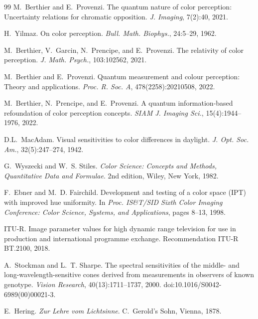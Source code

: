 \documentclass[11pt]{article}
\theoremstyle{plain}
\theoremstyle{definition}
\theoremstyle{remark}
\begin{document}
\begin{thebibliography}{99}
M.~Berthier and E.~Provenzi.
\newblock The quantum nature of color perception: Uncertainty relations for chromatic opposition.
\newblock \emph{J. Imaging}, 7(2):40, 2021.

H.~Yilmaz.
\newblock On color perception.
\newblock \emph{Bull. Math. Biophys.}, 24:5--29, 1962.

M.~Berthier, V.~Garcin, N.~Prencipe, and E.~Provenzi.
\newblock The relativity of color perception.
\newblock \emph{J. Math. Psych.}, 103:102562, 2021.

M.~Berthier and E.~Provenzi.
\newblock Quantum measurement and colour perception: Theory and applications.
\newblock \emph{Proc. R. Soc. A}, 478(2258):20210508, 2022.

M.~Berthier, N.~Prencipe, and E.~Provenzi.
\newblock A quantum information-based refoundation of color perception concepts.
\newblock \emph{SIAM J. Imaging Sci.}, 15(4):1944--1976, 2022.

D.L.~MacAdam.
\newblock Visual sensitivities to color differences in daylight.
\newblock \emph{J. Opt. Soc. Am.}, 32(5):247--274, 1942.

G.~Wyszecki and W.~S. Stiles.
\newblock \emph{Color Science: Concepts and Methods, Quantitative Data and Formulae}.
\newblock 2nd edition, Wiley, New York, 1982.

F.~Ebner and M.~D. Fairchild.
\newblock Development and testing of a color space ({IPT}) with improved hue uniformity.
\newblock In \emph{Proc. IS\&T/SID Sixth Color Imaging Conference: Color Science, Systems, and Applications}, pages 8--13, 1998.

{ITU-R}. Image parameter values for high dynamic range television for use in production and international programme exchange. Recommendation {ITU-R} {BT}.2100, 2018.

A.~Stockman and L.~T. Sharpe.
\newblock The spectral sensitivities of the middle- and long-wavelength-sensitive cones derived from measurements in observers of known genotype.
\newblock \emph{Vision Research}, 40(13):1711--1737, 2000.
\newblock doi:10.1016/S0042-6989(00)00021-3.

E.~Hering.
\newblock \emph{Zur Lehre vom Lichtsinne}.
\newblock C.~Gerold's Sohn, Vienna, 1878.


\end{thebibliography}
\end{document}
